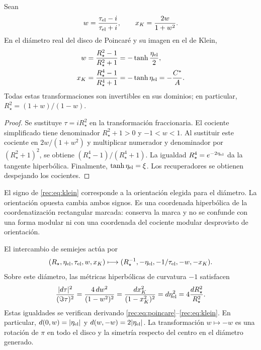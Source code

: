 \begin{theorem}
\label{rec:thm:klein}
Sean
\[
 w=\frac{\tau_{\rm el}-i}{\tau_{\rm el}+i},\qquad
 x_K=\frac{2w}{1+w^2}.
\]
En el diámetro real del disco de Poincaré y su imagen en el de Klein,
\begin{align}
 w&=\frac{R_\star^2-1}{R_\star^2+1}
      =-\tanh\frac{\eta_{\rm el}}2,\label{rec:eq:poincare}\\
 x_K&=\frac{R_\star^4-1}{R_\star^4+1}
      =-\tanh\eta_{\rm el}=-\frac{C^*}{A}.\label{rec:eq:klein}
\end{align}
Todas estas transformaciones son invertibles en sus dominios; en particular,
\(R_\star^2=(1+w)/(1-w)\).
\end{theorem}
\begin{proof}
Se sustituye \(\tau=iR_\star^2\) en la transformación fraccionaria. El cociente simplificado tiene denominador \(R_\star^2+1>0\) y \(-1<w<1\). Al sustituir este cociente en \(2w/(1+w^2)\) y multiplicar numerador y denominador por \((R_\star^2+1)^2\), se obtiene \((R_\star^4-1)/(R_\star^4+1)\). La igualdad \(R_\star^4=e^{-2\eta_{\rm el}}\) da la tangente hiperbólica. Finalmente, \(\tanh\eta_{\rm el}=\xi\). Los recuperadores se obtienen despejando los cocientes.
\end{proof}

El signo de \eqref{rec:eq:klein} corresponde a la orientación elegida para el diámetro. La orientación opuesta cambia ambos signos. Es una coordenada hiperbólica de la coordenatización rectangular marcada: conserva la marca y no se confunde con una forma modular ni con una coordenada del cociente modular desprovisto de orientación.

El intercambio de semiejes actúa por
\begin{equation}
 (R_\star,\eta_{\rm el},\tau_{\rm el},w,x_K)
 \longmapsto(R_\star^{-1},-\eta_{\rm el},-1/\tau_{\rm el},-w,-x_K).
 \label{rec:eq:reciproco-radial}
\end{equation}
Sobre este diámetro, las métricas hiperbólicas de curvatura \(-1\) satisfacen
\begin{equation}
 \frac{|d\tau|^2}{(\Im\tau)^2}
 =\frac{4\,dw^2}{(1-w^2)^2}
 =\frac{dx_K^2}{(1-x_K^2)^2}
 =d\eta_{\rm el}^2=4\frac{dR_\star^2}{R_\star^2}.
 \label{rec:eq:metricas}
\end{equation}
Estas igualdades se verifican derivando \eqref{rec:eq:poincare}--\eqref{rec:eq:klein}. En particular, \(d(0,w)=|\eta_{\rm el}|\) y \(d(w,-w)=2|\eta_{\rm el}|\). La transformación \(w\mapsto-w\) es una rotación de \(\pi\) en todo el disco y la simetría respecto del centro en el diámetro generado.

